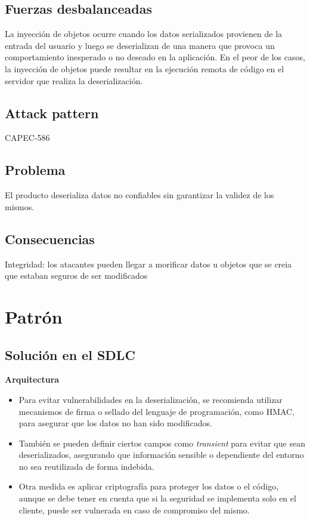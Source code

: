 \subsection*{Fuerzas desbalanceadas}
La inyección de objetos ocurre cuando los datos serializados provienen de la entrada del usuario y luego se deserializan de una manera que provoca un comportamiento inesperado o no deseado en la aplicación. En el peor de los casos, la inyección de objetos puede resultar en la ejecución remota de código en el servidor que realiza la deserialización.
\subsection*{Attack pattern}
CAPEC-586
\subsection*{Problema}
El producto deserializa datos no confiables sin garantizar la validez de los mismos.
\subsection*{Consecuencias}
Integridad: los atacantes pueden llegar a morificar datos u objetos que se creia que estaban seguros de ser modificados
\section{Patrón}

\subsection*{Solución en el SDLC}

\textbf{Arquitectura}
\begin{itemize}
    \item Para evitar vulnerabilidades en la deserialización, se recomienda utilizar mecanismos de firma o sellado del lenguaje de programación, como HMAC, para asegurar que los datos no han sido modificados.
    \item También se pueden definir ciertos campos como \textit{transient} para evitar que sean deserializados, asegurando que información sensible o dependiente del entorno no sea reutilizada de forma indebida.
    \item Otra medida es aplicar criptografía para proteger los datos o el código, aunque se debe tener en cuenta que si la seguridad se implementa solo en el cliente, puede ser vulnerada en caso de compromiso del mismo.
\end{itemize}

